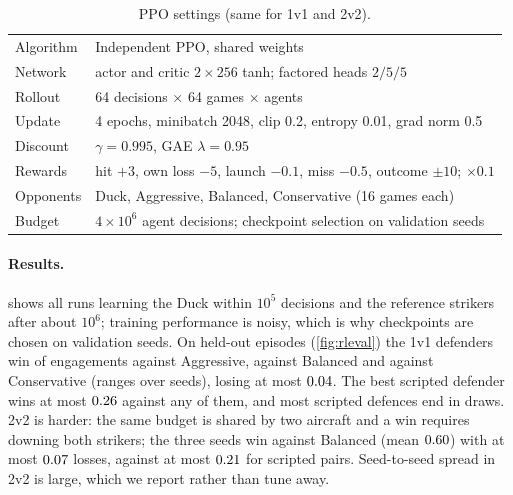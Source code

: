 \documentclass[11pt,a4paper]{article}
\begin{document}
\begin{table}[!htbp]
\centering
\caption{PPO settings (same for 1v1 and 2v2).}
\label{tab:hp}
\small
\begin{tabular}{@{}ll@{}}
\toprule
Algorithm & Independent PPO, shared weights~\cite{dewitt2020ippo} \\
Network & actor and critic $2{\times}256$ tanh; factored heads $2/5/5$ \\
Rollout & 64 decisions $\times$ 64 games $\times$ agents \\
Update & 4 epochs, minibatch 2048, clip 0.2, entropy 0.01, grad norm 0.5 \\
Discount & $\gamma=0.995$, GAE $\lambda=0.95$ \\
Rewards & hit $+3$, own loss $-5$, launch $-0.1$, miss $-0.5$, outcome $\pm10$; $\times0.1$ \\
Opponents & Duck, Aggressive, Balanced, Conservative (16 games each) \\
Budget & $4{\times}10^6$ agent decisions; checkpoint selection on validation seeds \\
\bottomrule
\end{tabular}
\end{table}

\paragraph{Results.}
 shows all runs learning the Duck within $10^5$ decisions and the reference strikers after about $10^6$; training performance is noisy, which is why checkpoints are chosen on validation seeds.
On held-out episodes (\cref{fig:rleval}) the 1v1 defenders win \RLOneWinRangeAgg{} of engagements against Aggressive, \RLOneWinRangeBal{} against Balanced and \RLOneWinRangeCon{} against Conservative (ranges over seeds), losing at most $0.04$.
The best scripted defender wins at most $0.26$ against any of them, and most scripted defences end in draws.
2v2 is harder: the same budget is shared by two aircraft and a win requires downing both strikers; the three seeds win \RLTwoWinRangeBal{} against Balanced (mean $0.60$) with at most $0.07$ losses, against at most $0.21$ for scripted pairs.
Seed-to-seed spread in 2v2 is large, which we report rather than tune away.
\end{document}
